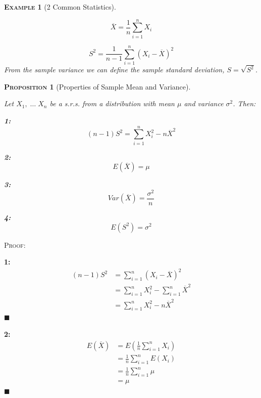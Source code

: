\documentclass[12pt,a4paper]{article}
\newtheorem{proposition}{\textsc{Proposition}}[section]
\newtheorem{example}{\textsc{Example}}[section]
\begin{document}
\begin{example}[2 Common Statistics]$\;$\par\vspace{1cm}

$$\overline{X} = \frac{1}{n} \sum_{i=1}^n X_i$$

$$S^2 = \frac{1}{n-1}\sum_{i=1}^n (X_i - \overline{X})^2$$
From the sample variance we can define the sample standard deviation, $S=\sqrt{S^2}$.

\end{example}

\begin{proposition}[Properties of Sample Mean and Variance]\label{sample moments}$\;$\par\vspace{1cm}

Let $X_1,\;\hdots\; X_n$ be a s.r.s. from a distribution with mean $\mu$ and variance $\sigma^2$. Then:

{\bf 1: }
$$(n-1)S^2 = \sum_{i=1}^n X_i^2 - n\overline{X}^2$$

{\bf 2:}
$$E(\overline{X}) = \mu$$

{\bf 3:}
$$Var(\overline{X}) = \frac{\sigma^2}{n}$$

{\bf 4:}
$$E(S^2) = \sigma^2$$

\end{proposition}

\noindent\textsc{Proof:}\par\vspace{1cm}

{\bf 1: }
\begin{align*}
(n-1)S^2 &= \sum_{i=1}^n (X_i-\overline{X})^2\\
&= \sum_{i=1}^n X_i^2 - \sum_{i=1}^n \overline{X}^2\\
&= \sum_{i=1}^n X_i^2 - n\overline{X}^2
\end{align*}\hfill$\blacksquare$

{\bf 2:}
\begin{align*}
E(\overline{X}) &= E(\frac{1}{n}\sum_{i=1}^n X_i)\\
&= \frac{1}{n}\sum_{i=1}^n E(X_i)\\
&= \frac{1}{n} \sum_{i=1}^n \mu\\
&= \mu
\end{align*}\hfill$\blacksquare$
\end{document}

